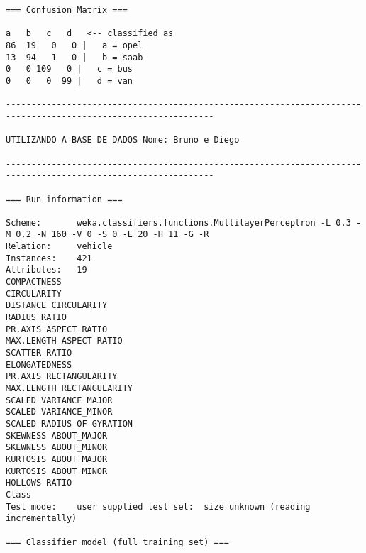 \documentclass[
	article,			%
	11pt,				%
	oneside,			%
	a4paper,			%
	english,			%
	brazil,				%
	sumario=tradicional
	]{abntex2}
\begin{document}
\begin{lstlisting}
=== Confusion Matrix ===

a   b   c   d   <-- classified as
86  19   0   0 |   a = opel
13  94   1   0 |   b = saab
0   0 109   0 |   c = bus
0   0   0  99 |   d = van

---------------------------------------------------------------------------------------------------------------

UTILIZANDO A BASE DE DADOS Nome: Bruno e Diego

---------------------------------------------------------------------------------------------------------------

=== Run information ===

Scheme:       weka.classifiers.functions.MultilayerPerceptron -L 0.3 -M 0.2 -N 160 -V 0 -S 0 -E 20 -H 11 -G -R
Relation:     vehicle
Instances:    421
Attributes:   19
COMPACTNESS
CIRCULARITY
DISTANCE CIRCULARITY
RADIUS RATIO
PR.AXIS ASPECT RATIO
MAX.LENGTH ASPECT RATIO
SCATTER RATIO
ELONGATEDNESS
PR.AXIS RECTANGULARITY
MAX.LENGTH RECTANGULARITY
SCALED VARIANCE_MAJOR
SCALED VARIANCE_MINOR
SCALED RADIUS OF GYRATION
SKEWNESS ABOUT_MAJOR
SKEWNESS ABOUT_MINOR
KURTOSIS ABOUT_MAJOR
KURTOSIS ABOUT_MINOR
HOLLOWS RATIO
Class
Test mode:    user supplied test set:  size unknown (reading incrementally)

=== Classifier model (full training set) ===


\end{lstlisting}
\end{document}
